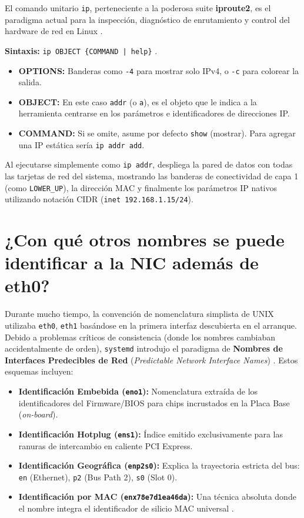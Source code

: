 \documentclass[a4paper,12pt]{article}
\begin{document}
El comando unitario \texttt{ip}, perteneciente a la poderosa suite \textbf{iproute2}, es el paradigma actual para la inspección, diagnóstico de enrutamiento y control del hardware de red en Linux \cite{ref46}.

\textbf{Sintaxis:} \texttt{ip OBJECT \{COMMAND | help\}} \cite{ref46}.
\begin{itemize}
    \item \textbf{OPTIONS:} Banderas como \texttt{-4} para mostrar solo IPv4, o \texttt{-c} para colorear la salida.
    \item \textbf{OBJECT:} En este caso \texttt{addr} (o \texttt{a}), es el objeto que le indica a la herramienta centrarse en los parámetros e identificadores de direcciones IP.
    \item \textbf{COMMAND:} Si se omite, asume por defecto \texttt{show} (mostrar). Para agregar una IP estática sería \texttt{ip addr add}.
\end{itemize}

Al ejecutarse simplemente como \texttt{ip addr}, despliega la pared de datos con todas las tarjetas de red del sistema, mostrando las banderas de conectividad de capa 1 (como \texttt{LOWER\_UP}), la dirección MAC y finalmente los parámetros IP nativos utilizando notación CIDR (\texttt{inet 192.168.1.15/24}).

\section{¿Con qué otros nombres se puede identificar a la NIC además de eth0?}

Durante mucho tiempo, la convención de nomenclatura simplista de UNIX utilizaba \texttt{eth0}, \texttt{eth1} basándose en la primera interfaz descubierta en el arranque. Debido a problemas críticos de consistencia (donde los nombres cambiaban accidentalmente de orden), \texttt{systemd} introdujo el paradigma de \textbf{Nombres de Interfaces Predecibles de Red} (\textit{Predictable Network Interface Names}) \cite{ref52}. Estos esquemas incluyen:

\begin{itemize}
    \item \textbf{Identificación Embebida (\texttt{eno1}):} Nomenclatura extraída de los identificadores del Firmware/BIOS para chips incrustados en la Placa Base (\textit{on-board}).
    \item \textbf{Identificación Hotplug (\texttt{ens1}):} Índice emitido exclusivamente para las ranuras de intercambio en caliente PCI Express.
    \item \textbf{Identificación Geográfica (\texttt{enp2s0}):} Explica la trayectoria estricta del bus: \texttt{en} (Ethernet), \texttt{p2} (Bus Path 2), \texttt{s0} (Slot 0).
    \item \textbf{Identificación por MAC (\texttt{enx78e7d1ea46da}):} Una técnica absoluta donde el nombre integra el identificador de silicio MAC universal \cite{ref52}.
\end{itemize}
\end{document}
